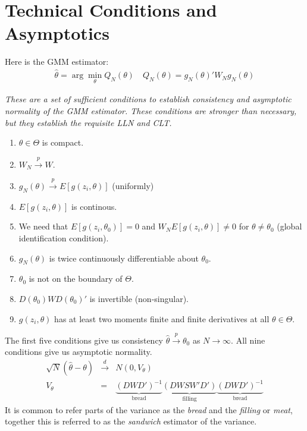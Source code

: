 \documentclass[a4paper]{article}
\begin{document}
\section*{\normalsize  Technical Conditions and Asymptotics}
Here is the GMM estimator:
\begin{eqnarray*}
\hat{\theta} = \arg \min_{\theta}  Q_N(\theta) \quad Q_N(\theta)=g_N(\theta)' W_N  g_N(\theta)
\end{eqnarray*}

\textit{These are a set of sufficient conditions to establish consistency and asymptotic normality of the GMM estimator. These conditions are stronger than necessary, but they establish the requisite LLN and CLT.}
\begin{enumerate}
\item $\theta \in \Theta$ is compact.
\item $W_N \overset{p}{\to} W$.
\item $g_N(\theta) \overset{p}{\to} E[g(z_i,\theta)]$ (uniformly)
\item $E[g(z_i,\theta)]$ is continous.
\item We need that $E[g(z_i,\theta_0)]=0$ and $W_N E[g(z_i,\theta)] \neq 0$ for $\theta \neq \theta_0$ (global identification condition).
\item $g_N(\theta)$ is twice continuously differentiable about $\theta_0$.
\item $\theta_0$ is not on the boundary of $\Theta$.
\item $D(\theta_0) W D(\theta_0)'$ is invertible (non-singular).
\item $g(z_i,\theta)$ has at least two moments finite and finite derivatives at all $\theta \in \Theta$.
\end{enumerate}
The first five conditions give us consistency $\hat{\theta} \overset{p}{\to} \theta_0$ as $N \rightarrow \infty$. All nine conditions give us asymptotic normality.
\begin{eqnarray*}
\sqrt{N}(\hat{\theta}-\theta)  &\overset{d}{\to}& N(0,V_{\theta})\\
V_{\theta} &=& \underbrace{(D W D')^{-1}}_{\mbox{bread}} \underbrace{(D W S W' D')}_{\mbox{filling}}\underbrace{(D W D')^{-1}}_{\mbox{bread}} 
\end{eqnarray*}
It is common to refer parts of the variance as the \textit{bread} and the \textit{filling} or \textit{meat}, together this is referred to as the \textit{sandwich} estimator of the variance.
\end{document}
